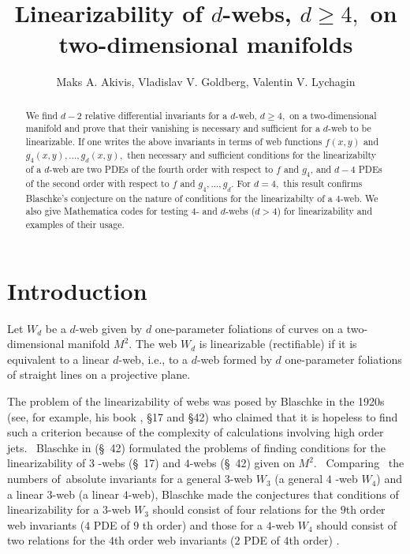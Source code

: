 \documentclass{article}
\begin{document}
\title{Linearizability of $d$-webs, $d\geq 4,$ on two-dimensional manifolds}
\author{Maks A. Akivis, Vladislav V. Goldberg, Valentin V. Lychagin}
\maketitle

\begin{abstract}
We find $d - 2$ relative differential invariants for a $d$-web, $d\geq 4,$
on a two-dimensional manifold and prove that their vanishing is necessary
and sufficient for a $d$-web to be linearizable. If one writes the above
invariants in terms of web functions $f(x,y)$ and $%
g_{4}(x,y),...,g_{d}(x,y), $ then necessary and sufficient
conditions for the linearizabilty of a $d$-web are two PDEs of the
fourth order with respect to $f$ and $g_{4}$, and $d - 4$ PDEs of
the second order with respect to $f$ and $g_{4},...,g_{d}$. For $d
= 4,$ this result confirms Blaschke's conjecture on the nature of
conditions for the linearizabilty of a $4$-web. We also give
Mathematica codes for testing $4$- and $d$-webs ($d
> 4$) for linearizability and examples of their usage.
\end{abstract}

\section{\protect\bigskip Introduction}

Let $W_{d}$ be a $d$-web given by $d$ one-parameter foliations of curves on
a two-dimensional manifold $M^{2}$. The web $W_{d}$ is linearizable
(rectifiable) if it is equivalent to a linear $d$-web, i.e., to a $d$-web
formed by $d$ one-parameter foliations of straight lines on a projective
plane.

The problem of the linearizability of webs was posed by Blaschke in the
1920s (see, for example, his book \cite{B 55}, \S 17 and \S 42) who claimed
that it is hopeless to find such a criterion because of the complexity of
calculations involving high order jets. \ Blaschke in \cite{B 55} (\S\ 42)
formulated the problems of finding conditions for the linearizability of $3$%
-webs (\S\ 17) and $4$-webs (\S\ 42) given on $M^{2}.$ \ Comparing \ the
numbers of\ absolute invariants for a general $3$-web $W_{3}$ (a general $4$%
-web $W_{4}$) and a linear $3$-web (a linear $4$-web), Blaschke made the
conjectures that conditions of linearizability for a $3$-web $W_{3}$ should
consist of four relations for the $9$th order web invariants ($4$ PDE of $9$%
th order) and those for a $4$-web $W_{4}$ should consist of two relations
for the $4$th order web invariants ($2$ PDE of $4$th order) .
\end{document}
